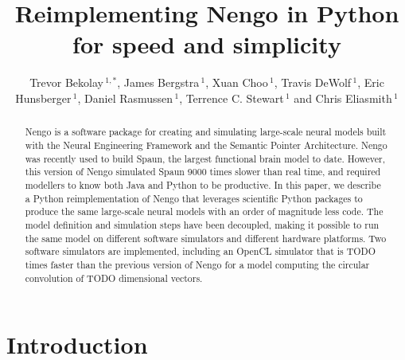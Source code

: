 \documentclass{frontiersSCNS}
\def\keyFont{\fontsize{8}{11}\helveticabold }
\def\firstAuthorLast{Bekolay {et~al.}}
\def\Authors{Trevor Bekolay\,$^{1,*}$, James Bergstra\,$^{1}$,
  Xuan Choo\,$^{1}$, Travis DeWolf\,$^{1}$, Eric Hunsberger\,$^{1}$,
  Daniel Rasmussen\,$^{1}$, Terrence C. Stewart\,$^{1}$
  and Chris Eliasmith\,$^{1}$}
\begin{document}
\onecolumn
{}

\title[Nengo in Python]{Reimplementing Nengo in Python for speed and simplicity}
\author[\firstAuthorLast ]{\Authors}
\address{}
\correspondance{}
\extraAuth{}

\maketitle


\begin{abstract}
  Nengo is a software package for creating and simulating
  large-scale neural models built with
  the Neural Engineering Framework
  and the Semantic Pointer Architecture.
  Nengo was recently used to build Spaun, the largest
  functional brain model to date.
  However, this version of Nengo simulated Spaun
  9000 times slower than real time,
  and required modellers to know
  both Java and Python to be productive.
  In this paper, we describe a Python reimplementation of Nengo
  that leverages scientific Python packages
  to produce the same large-scale neural models
  with an order of magnitude less code.
  The model definition and simulation steps
  have been decoupled,
  making it possible to run the same model
  on different software simulators
  and different hardware platforms.
  Two software simulators are implemented,
  including an OpenCL simulator
  that is TODO times faster than
  the previous version of Nengo
  for a model computing the circular convolution
  of TODO dimensional vectors.

  \tiny \keyFont{\section{Keywords:} 1 2 3 4 5 (6 7 8)}
\end{abstract}


\section{Introduction}
\end{document}
